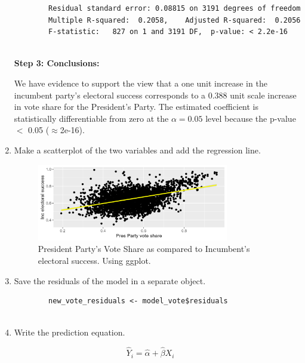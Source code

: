 \documentclass[12pt,letterpaper]{article}
\begin{document}
\begin{enumerate}
\begin{verbatim}
		Residual standard error: 0.08815 on 3191 degrees of freedom
		Multiple R-squared:  0.2058,	Adjusted R-squared:  0.2056 
		F-statistic:   827 on 1 and 3191 DF,  p-value: < 2.2e-16
		
	\end{verbatim}
	
	\textbf{Step 3: Conclusions:}
	
	We have evidence to support the view that a one unit increase in the incumbent party's electoral success corresponds to a 0.388 unit scale increase in vote share for the President's Party. The estimated coefficient is statistically differentiable from zero at the $\alpha=0.05$ level because the p-value $<$ 0.05 ($\approx $2e-16). \\
	
	
	\item Make a scatterplot of the two variables and add the regression line. 	
	
	  
	
	\begin{figure}[h!]
		\centering
		\caption{\footnotesize President Party's Vote Share as compared to Incumbent's electoral success. Using ggplot.}
		\includegraphics[width=0.79\textwidth]{vote_share2_scatter.png}
		
	\end{figure} 
	
	\newpage
	
	\item Save the residuals of the model in a separate object.	
	
	\begin{verbatim}
		new_vote_residuals <- model_vote$residuals
		
	\end{verbatim}
	
	
	\item Write the prediction equation.
	
\end{enumerate}		

{\large 			$$\hat{Y}_i = \hat{\alpha} +  \hat{\beta}X_i $$}
\end{document}
